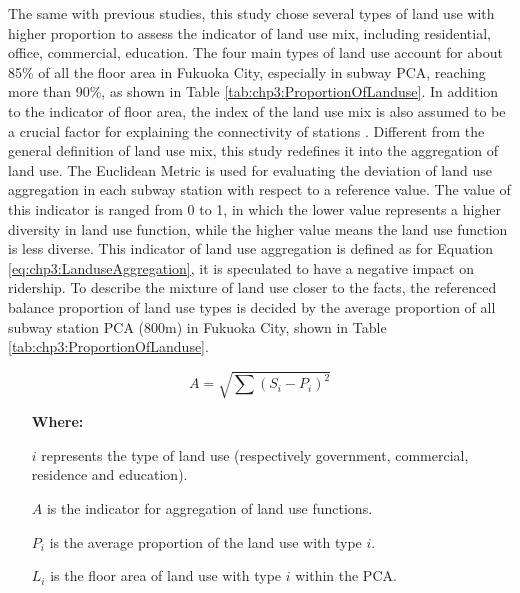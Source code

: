 %
The same with previous studies, this study chose several types of land use with higher proportion to assess the indicator of land use mix, including residential, office, commercial, education. The four main types of land use account for about 85\% of all the floor area in Fukuoka City, especially in subway PCA, reaching more than 90\%, as shown in Table \ref{tab:chp3:ProportionOfLanduse}. In addition to the indicator of floor area, the index of the land use mix is also assumed to be a crucial factor for explaining the connectivity of stations \cite{badoe2000transportation,cervero2004transit,frank2004obesity}. Different from the general definition of land use mix, this study redefines it into the aggregation of land use. The Euclidean Metric is used for evaluating the deviation of land use aggregation in each subway station with respect to a reference value. The value of this indicator is ranged from 0 to 1, in which the lower value represents a higher diversity in land use function, while the higher value means the land use function is less diverse. This indicator of land use aggregation is defined as for Equation \ref{eq:chp3:LanduseAggregation}, it is speculated to have a negative impact on ridership. To describe the mixture of land use closer to the facts, the referenced balance proportion of land use types is decided by the average proportion of all subway station PCA (800m) in Fukuoka City, shown in Table \ref{tab:chp3:ProportionOfLanduse}.

\begin{equation}
	A=\sqrt{\sum (S_i-P_i)^2}
	\label{eq:chp3:LanduseAggregation}
\end{equation}

\begin{enumerate}
	\item[\textbf{Where:}]
	\item[$i$] represents the type of land use (respectively government, commercial, residence and education).
	\item[$A$] is the indicator for aggregation of land use functions.
	\item[$P_i$] is the average proportion of the land use with type $i$.
	\item[$L_i$] is the floor area of land use with type $i$ within the PCA.
\end{enumerate}

